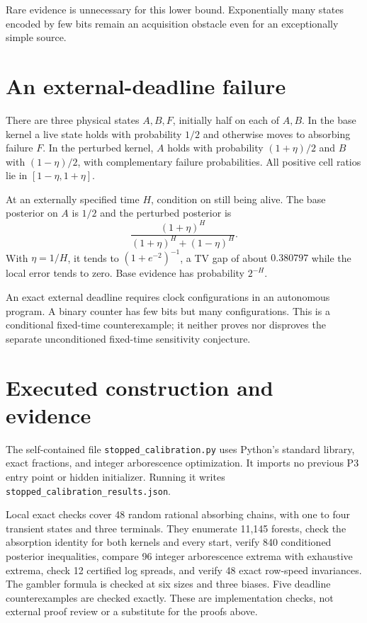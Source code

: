 \documentclass[11pt]{article}
\begin{document}
Rare evidence is unnecessary for this lower bound. Exponentially many
states encoded by few bits remain an acquisition obstacle even for an
exceptionally simple source.

\section{An external-deadline failure}\label{sec:deadline}

There are three physical states $A,B,F$, initially half on each of $A,B$.
In the base kernel a live state holds with probability $1/2$ and otherwise
moves to absorbing failure $F$. In the perturbed kernel, $A$ holds with
probability $(1+\eta)/2$ and $B$ with $(1-\eta)/2$, with complementary
failure probabilities. All positive cell ratios lie in $[1-\eta,1+\eta]$.

At an externally specified time $H$, condition on still being alive.
The base posterior on $A$ is $1/2$ and the perturbed posterior is
\[
 \frac{(1+\eta)^H}{(1+\eta)^H+(1-\eta)^H}.
\]
With $\eta=1/H$, it tends to $(1+e^{-2})^{-1}$, a TV gap of about
$0.380797$ while the local error tends to zero. Base evidence has
probability $2^{-H}$.

An exact external deadline requires clock configurations in an autonomous
program. A binary counter has few bits but many configurations.
This is a conditional fixed-time counterexample; it neither proves nor
disproves the separate unconditioned fixed-time sensitivity conjecture.

\section{Executed construction and evidence}

The self-contained file \texttt{stopped\_calibration.py} uses Python's
standard library, exact fractions, and integer arborescence optimization.
It imports no previous P3 entry point or hidden initializer. Running it
writes \texttt{stopped\_calibration\_results.json}.

Local exact checks cover 48 random rational absorbing chains, with one
to four transient states and three terminals. They enumerate 11,145
forests, check the absorption identity for both kernels and every start,
verify 840 conditioned posterior inequalities, compare 96 integer
arborescence extrema with exhaustive extrema, check 12 certified log
spreads, and verify 48 exact row-speed invariances. The gambler formula
is checked at six sizes and three biases. Five deadline counterexamples
are checked exactly. These are implementation checks, not external proof
review or a substitute for the proofs above.
\end{document}

